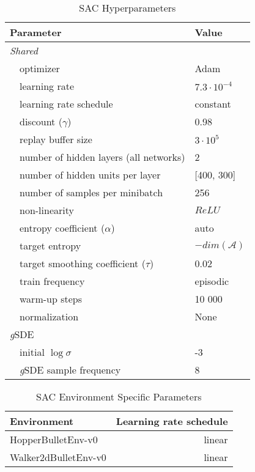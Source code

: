 \documentclass{article}
\newcommand{\aspace}{\mathcal{A}}
\newcommand{\ourSDE}{\textit{g}\textsc{SDE}\xspace}
\newcommand{\sac}{\textsc{SAC}\xspace}
\begin{document}
\begin{table}[h]
\renewcommand{\arraystretch}{1.1}
\centering
\caption{\sac Hyperparameters}
\label{tab:sac_shared_params}
\vspace{1mm}
  \begin{tabular}{@{}l l| l@{}}
    \toprule
    \multicolumn{2}{l|}{Parameter} &  Value\\
    \midrule
    \multicolumn{2}{l|}{\textit{Shared}}& \\
    & optimizer & Adam~\citep{kingma2014adam}\\
    & learning rate & $7.3 \cdot 10^{-4}$\\
    & learning rate schedule & constant \\
    & discount ($\gamma$) &  0.98\\
    & replay buffer size & $3 \cdot 10^{5}$\\
    & number of hidden layers (all networks) & 2\\
    & number of hidden units per layer & [400, 300]\\
    & number of samples per minibatch & 256\\
    & non-linearity & $ReLU$\\
    & entropy coefficient ($\alpha$) & auto\\
    & target entropy & $- dim(\aspace)$\\
    & target smoothing coefficient ($\tau$)& 0.02\\
    & train frequency & episodic\\
    & warm-up steps & 10 000\\
    & normalization & None\\
    \midrule
    \multicolumn{2}{l|}{\ourSDE}& \\
    & initial $\log \sigma$ & -3\\
    & \ourSDE sample frequency & 8\\
    \bottomrule
  \end{tabular}
\end{table}

\begin{table}[h]
\renewcommand{\arraystretch}{1.1}
\centering
\caption{\sac Environment Specific Parameters}
\label{tab:sac_env_params}
\vspace{1mm}
  \begin{tabular}{@{}l r@{}}
    \toprule
    Environment 	& Learning rate schedule\\
    \midrule
    HopperBulletEnv-v0  & linear\\
    Walker2dBulletEnv-v0 & linear\\
    \bottomrule
  \end{tabular}
\end{table}
\end{document}
